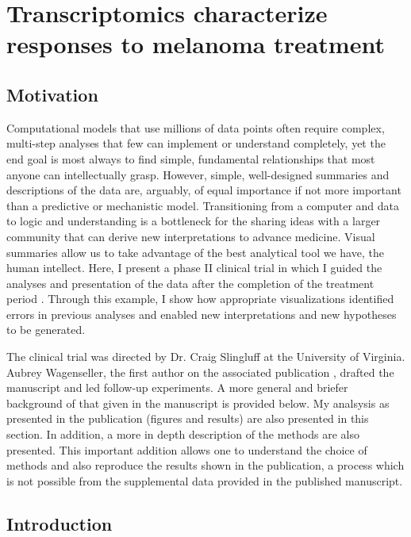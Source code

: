 
\chapter[miRNA Transcriptomics of melanoma]
{ Transcriptomics characterize responses to melanoma treatment }\label{chapter:jtm}

\section{Motivation}

Computational models that use millions of data points
often require complex, multi-step analyses that few can implement or understand completely, 
yet the end goal is most always 
to find simple, fundamental relationships
that most anyone can intellectually grasp. However, simple, well-designed
summaries and descriptions of the data are, arguably, of equal importance if not
more important than a predictive or mechanistic model.
Transitioning from a computer and data to logic and understanding is a
bottleneck for the sharing ideas with a larger community
that can derive new interpretations to advance medicine.
Visual summaries allow us to take advantage of the best
analytical tool we have, the human intellect.
Here, I present a phase II
clinical trial in which I guided the analyses and presentation of the data
after the completion of the treatment period \cite{Wagenseller:2013fj}.
Through this example, I show how appropriate visualizations identified
errors in previous analyses and enabled new interpretations and new
hypotheses to be generated.

The clinical trial was directed by Dr. Craig Slingluff at the
University of Virginia. Aubrey Wagenseller, the first author on the associated
publication \cite{Wagenseller:2013fj}, drafted the manuscript 
and led follow-up experiments. A more general and briefer background
of that given in the manuscript is provided below. My analsysis as presented
in the publication (figures and results) are also presented in this section. 
In addition, a more in depth description of the
methods are also presented. This important addition allows one to understand
the choice of methods and also reproduce
the results shown in the publication, a process which is not possible from the
supplemental data provided in the published manuscript.

\section{Introduction}

